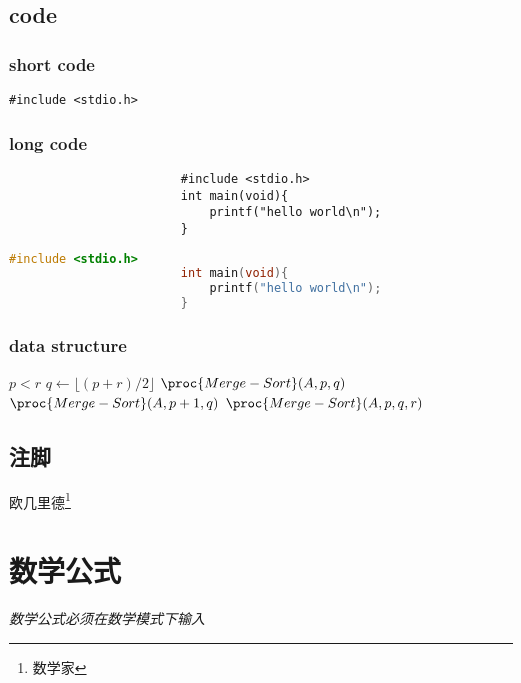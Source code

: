\documentclass[twocolumn]{ctexart}
\begin{document}
            \subsection{code}
                \subsubsection{short code}
                    \verb |#include <stdio.h>|
                \subsubsection{long code}
                    \begin{verbatim}
                        #include <stdio.h>
                        int main(void){
                            printf("hello world\n");
                        }
                    \end{verbatim}
                
                    \begin{lstlisting}[language=C]
                        #include <stdio.h>
                        int main(void){
                            printf("hello world\n");
                        }
                    \end{lstlisting}

                \subsubsection{data structure}
                    \begin{codebox}
                        \li \If $p<r$
                        \li \Then $q \gets \lfloor(p+r)/
                        2\rfloor$
                        \li $\proc{Merge-Sort}(A, p, q)$
                        \li $\proc{Merge-Sort}(A, p+1, q)$
                        \li $\proc{Merge-Sort}(A, p, q, r)$
                            \End
                    \end{codebox}
            \subsection{注脚}
            欧几里德\footnote{数学家}
        \section{数学公式}
            \emph{数学公式必须在数学模式下输入}
\end{document}

